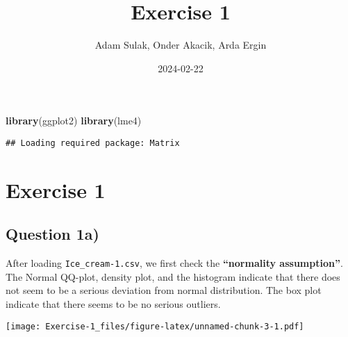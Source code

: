 \documentclass[
]{article}
\title{Exercise 1}
\author{Adam Sulak, Onder Akacik, Arda Ergin}
\date{2024-02-22}
\newenvironment{Shaded}{\begin{snugshade}}{\end{snugshade}}
\newcommand{\AttributeTok}[1]{\textcolor[rgb]{0.13,0.29,0.53}{#1}}
\newcommand{\DecValTok}[1]{\textcolor[rgb]{0.00,0.00,0.81}{#1}}
\newcommand{\FunctionTok}[1]{\textcolor[rgb]{0.13,0.29,0.53}{\textbf{#1}}}
\newcommand{\NormalTok}[1]{#1}
\newcommand{\SpecialCharTok}[1]{\textcolor[rgb]{0.81,0.36,0.00}{\textbf{#1}}}
\newcommand{\StringTok}[1]{\textcolor[rgb]{0.31,0.60,0.02}{#1}}
\begin{document}
\maketitle

\begin{Shaded}
\begin{Highlighting}[]
\FunctionTok{library}\NormalTok{(ggplot2)}
\FunctionTok{library}\NormalTok{(lme4)}
\end{Highlighting}
\end{Shaded}

\begin{verbatim}
## Loading required package: Matrix
\end{verbatim}

\hypertarget{exercise-1}{%
\section{Exercise 1}\label{exercise-1}}

\hypertarget{question-1a}{%
\subsection{Question 1a)}\label{question-1a}}

After loading \texttt{Ice\_cream-1.csv}, we first check the
\textbf{``normality assumption''}. The Normal QQ-plot, density plot, and
the histogram indicate that there does not seem to be a serious
deviation from normal distribution. The box plot indicate that there
seems to be no serious outliers.

\begin{Shaded}
\end{Shaded}

\texttt{[image: Exercise-1\_files/figure-latex/unnamed-chunk-3-1.pdf]}

\begin{Shaded}
\end{Shaded}
\end{document}
